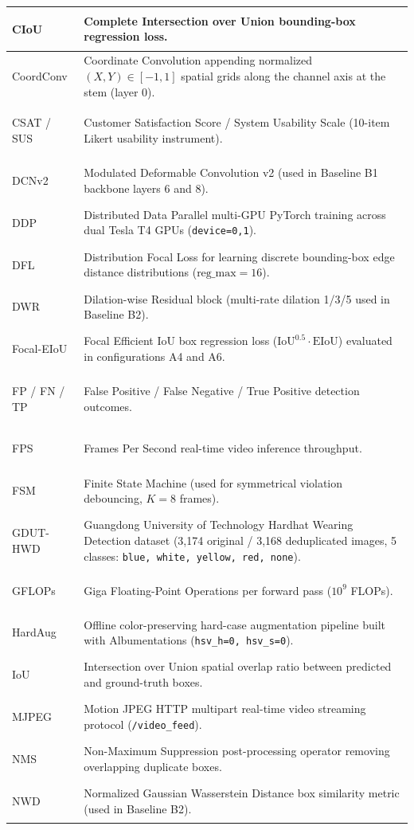 \begin{longtable}{|>{\bfseries\raggedright\arraybackslash}p{3.8cm}|p{10.5cm}|}
CIoU & Complete Intersection over Union bounding-box regression loss. \\ \hline
CoordConv & Coordinate Convolution appending normalized $(X, Y) \in [-1, 1]$ spatial grids along the channel axis at the stem (layer 0). \\ \hline
CSAT / SUS & Customer Satisfaction Score / System Usability Scale (10-item Likert usability instrument). \\ \hline
DCNv2 & Modulated Deformable Convolution v2 (used in Baseline B1 backbone layers 6 and 8). \\ \hline
DDP & Distributed Data Parallel multi-GPU PyTorch training across dual Tesla T4 GPUs (\texttt{device=0,1}). \\ \hline
DFL & Distribution Focal Loss for learning discrete bounding-box edge distance distributions ($\text{reg\_max}=16$). \\ \hline
DWR & Dilation-wise Residual block (multi-rate dilation 1/3/5 used in Baseline B2). \\ \hline
Focal-EIoU & Focal Efficient IoU box regression loss ($\mathrm{IoU}^{0.5} \cdot \mathrm{EIoU}$) evaluated in configurations A4 and A6. \\ \hline
FP / FN / TP & False Positive / False Negative / True Positive detection outcomes. \\ \hline
FPS & Frames Per Second real-time video inference throughput. \\ \hline
FSM & Finite State Machine (used for symmetrical violation debouncing, $K=8$ frames). \\ \hline
GDUT-HWD & Guangdong University of Technology Hardhat Wearing Detection dataset (3,174 original / 3,168 deduplicated images, 5 classes: \texttt{blue, white, yellow, red, none}). \\ \hline
GFLOPs & Giga Floating-Point Operations per forward pass ($10^9$ FLOPs). \\ \hline
HardAug & Offline color-preserving hard-case augmentation pipeline built with Albumentations (\nolinkurl{hsv_h=0, hsv_s=0}). \\ \hline
IoU & Intersection over Union spatial overlap ratio between predicted and ground-truth boxes. \\ \hline
MJPEG & Motion JPEG HTTP multipart real-time video streaming protocol (\texttt{/video\_feed}). \\ \hline
NMS & Non-Maximum Suppression post-processing operator removing overlapping duplicate boxes. \\ \hline
NWD & Normalized Gaussian Wasserstein Distance box similarity metric (used in Baseline B2). \\ \hline

\end{longtable}
